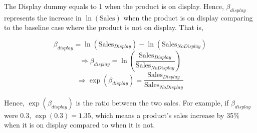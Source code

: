\documentclass[10pt,article]{article}
\begin{document}
\begin{mdframed}[frametitle={Interpretation of \( \beta_{display} \)}]
The Display dummy equals to 1 when the product is on display. Hence, \(\beta_{display}\) represents the increase in \(\ln(\text{Sales})\) when the
product is on display comparing to the baseline case where the product is not
on display.  That is,

\[ \beta_{display} = \ln(\text{Sales}_{Display}) - \ln(\text{Sales}_{NoDisplay}) \]
\[ \Rightarrow \beta_{display} = \ln\left(\dfrac{\text{Sales}_{Display}}{\text{Sales}_{NoDisplay}}\right) \]
\[ \Rightarrow \exp(\beta_{display}) = \dfrac{\text{Sales}_{Display}}{\text{Sales}_{NoDisplay}} \]

Hence, \(\exp(\beta_{display})\) is the ratio between the two sales. For
example, if \(\beta_{display}\) were 0.3, \(\exp(0.3) = 1.35\), which
means a product's sales increase by 35\% when it is on display compared to when
it is not.
\end{mdframed}
\end{document}
